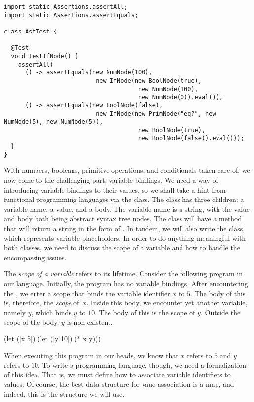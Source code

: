 \begin{lstlisting}[language=MyJava]
import static Assertions.assertAll;
import static Assertions.assertEquals;

class AstTest {
  
  @Test
  void testIfNode() {
    assertAll(
      () -> assertEquals(new NumNode(100),
                          new IfNode(new BoolNode(true),
                                      new NumNode(100),
                                      new NumNode(0)).eval()),
      () -> assertEquals(new BoolNode(false),
                          new IfNode(new PrimNode("eq?", new NumNode(5), new NumNode(5)),
                                      new BoolNode(true),
                                      new BoolNode(false)).eval()));
  }
}  
\end{lstlisting}

With numbers, booleans, primitive operations, and conditionals taken care of, we now come to the challenging part: variable bindings. 
We need a way of introducing variable bindings to their values, so we shall take a hint from functional programming languages via the  class. 
The  class has three children: a variable name, a value, and a body. 
The variable name is a string, with the value and body both being abstract syntax tree nodes. 
The  class will have a  method that will return a string in the form of . 
In tandem, we will also write the  class, which represents variable placeholders. In order to do anything meaningful with both classes, we need to discuss the scope of a variable and how to handle the encompassing issues.

The \emph{scope of a variable} refers to its lifetime. Consider the following program in our language. Initially, the program has no variable bindings. After encountering the , we enter a scope that binds the variable identifier $x$ to $5$. The body of this  is, therefore, the \emph{scope} of~$x$. Inside this body, we encounter yet another variable, namely $y$, which binds $y$ to $10$. The body of this  is the scope of $y$. Outside the scope of the body, $y$ is non-existent.
\begin{verbnobox}[\small]
(let ([x 5])
  (let ([y 10])
    (* x y)))
\end{verbnobox}
When executing this program in our heads, we know that $x$ refers to $5$ and $y$ refers to $10$. To write a programming language, though, we need a formalization of this idea. That is, we must define how to associate variable identifiers to values. Of course, the best data structure for vaue association is a map, and indeed, this is the structure we will use.

